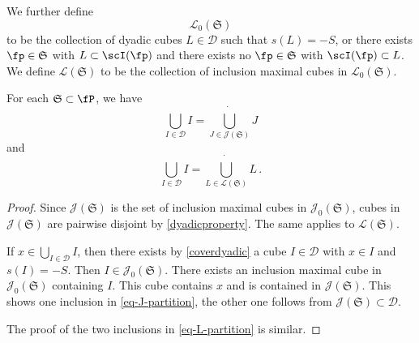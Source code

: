 We further define
$$
    \mathcal{L}_0(\mathfrak{S})
$$
to be the collection of dyadic cubes $L \in \mathcal{D}$ such that $s(L) = -S$, or there exists $\fp \in \mathfrak{S}$ with $L \subset \scI(\fp)$ and there exists no $\fp \in \mathfrak{S}$ with $\scI(\fp) \subset L$. We define $\mathcal{L}(\mathfrak{S})$ to be the collection of inclusion maximal cubes in $\mathcal{L}_0(\mathfrak{S})$.

\begin{lemma}
    \label{dyadic-partitions}
    \leanok
    For each $\mathfrak{S} \subset \fP$, we have
    \begin{equation}
        \label{eq-J-partition}
        \bigcup_{I \in \mathcal{D}} I = \dot{\bigcup_{J \in \mathcal{J}(\mathfrak{S})}} J
    \end{equation}
    and
    \begin{equation}
        \label{eq-L-partition}
        \bigcup_{I \in \mathcal{D}} I = \dot{\bigcup_{L \in \mathcal{L}(\mathfrak{S})}} L\,.
    \end{equation}
\end{lemma}

\begin{proof}
    \leanok
    Since $\mathcal{J}(\mathfrak{S})$ is the set of inclusion maximal cubes in $\mathcal{J}_0(\mathfrak{S})$, cubes in $\mathcal{J}(\mathfrak{S})$ are pairwise disjoint by \eqref{dyadicproperty}. The same applies to $\mathcal{L}(\mathfrak{S})$.

    If $x \in \bigcup_{I \in \mathcal{D}} I$, then there exists by \eqref{coverdyadic} a cube $I \in \mathcal{D}$ with $x \in I$ and $s(I) = -S$. Then $I \in \mathcal{J}_0(\mathfrak{S})$. There exists an inclusion maximal cube in $\mathcal{J}_0(\mathfrak{S})$ containing $I$. This cube contains $x$ and is contained in $\mathcal{J}(\mathfrak{S})$. This shows one inclusion in \eqref{eq-J-partition}, the other one follows from $\mathcal{J}(\mathfrak{S}) \subset \mathcal{D}$.

    The proof of the two inclusions in \eqref{eq-L-partition} is similar.
\end{proof}

